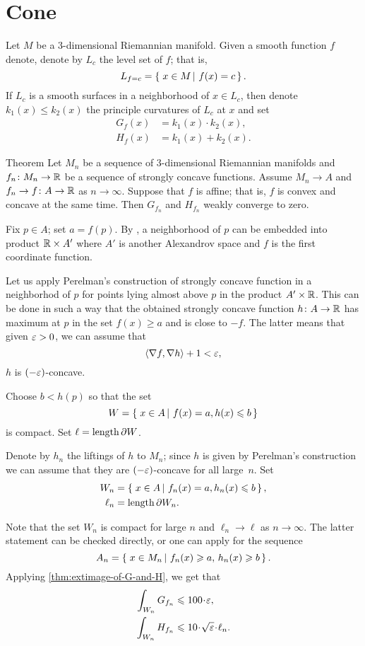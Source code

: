 \section{Cone}

Let $M$ be a 3-dimensional Riemannian manifold.
Given a smooth function $f$ denote, denote by $L_c$ the level set of $f$;
that is,
\[L_{f=c}=\set{x\in M}{f(x)=c}.\]
If $L_c$ is a smooth surfaces in a neighborhood of $x\in L_c$,
then denote $k_1(x)\le k_2(x)$ the principle curvatures of $L_c$ at $x$
and set 
\begin{align*}
G_f(x)&=k_1(x)\cdot k_2(x),
\\
H_f(x)&=k_1(x)+ k_2(x).
\end{align*}


\begin{thm}{Theorem}
Let $M_n$ be a sequence of $3$-dimensional Riemannian manifolds
and $f_n\colon M_n\to \mathbb{R}$ be a sequence of strongly concave functions.
Assume $M_n\to A$ and $f_n\to f\colon A\to \mathbb{R}$ as $n\to \infty$.
Suppose that $f$ is affine; that is, $f$ is convex and concave at the same time.
Then $G_{f_n}$ and $H_{f_n}$ weakly converge to zero.
\end{thm}

Fix $p\in A$; set $a=f(p)$.
By \cite{LS}, a neighborhood of $p$ can be embedded into product $\mathbb{R}\times A'$ where $A'$ is another Alexandrov space and $f$ is the first coordinate function.

Let us apply Perelman's construction of strongly concave function in a neighborhod of $p$ for points lying almost above $p$ in the product $A'\times \mathbb{R}$.
This can be done in such a way that the obtained strongly concave function $h\colon A\to \mathbb{R}$ has maximum at $p$ in the set $f(x)\ge a$ and
is close to $-f$.
The latter means that
given $\varepsilon>0$, we can assume that 
\[\langle\nabla f,\nabla h\rangle+1<\varepsilon,\]
$h$ is $(-\varepsilon)$-concave.

Choose $b<h(p)$ so that the set 
\[W=\set{x\in A}{f(x)=a, h(x)\le b}\]
is compact.
Set $\ell=\operatorname{\rm length}\nolimits\partial W$.

Denote by $h_n$ the liftings of $h$ to $M_n$; since $h$ is given by Perelman's construction we can assume that they are $(-\varepsilon)$-concave for all large~$n$.
Set 
\begin{align*}
W_n&=\set{x\in A}{f_n(x)=a, h_n(x)\le b},
\\
\ell_n&=\length\partial W_n.
\end{align*}

Note that the set $W_n$ is compact for large $n$ and $\ell_n\to \ell$ as $n\to\infty$.
The latter statement can be checked directly,
or one can apply \cite[Theorem 1.2]{petrunin-GC} for the sequence 
\[A_n=\set{x\in M_n}{f_n(x)\ge a,\, h_n(x)\ge b}.\]
Applying \ref{thm:extimage-of-G-and-H}, we get that 
\begin{align*}
\int_{W_n}G_{f_n}&\le 100\cdot\eps,
\\
\int_{W_n}H_{f_n}&\le 10\cdot \sqrt{\eps}\cdot \ell_n.
\end{align*}

